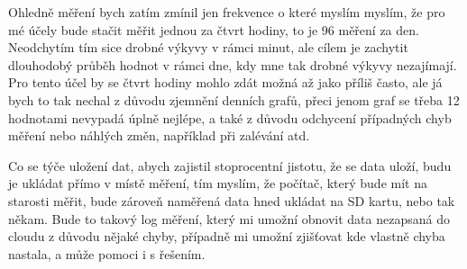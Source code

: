 
Ohledně měření bych zatím zmínil jen frekvence o které myslím myslím, že pro mé účely bude stačit měřit jednou za čtvrt 
hodiny, to je 96 měření za den. Neodchytím tím sice drobné výkyvy v rámci minut, ale cílem je zachytit dlouhodobý průběh 
hodnot v rámci dne, kdy mne tak drobné výkyvy nezajímají. Pro tento účel by se čtvrt hodiny mohlo zdát možná až jako 
příliš často, ale já bych to tak nechal z důvodu zjemnění denních grafů, přeci jenom graf se třeba 12 hodnotami nevypadá 
úplně nejlépe, a také z důvodu odchycení případných chyb měření nebo náhlých změn, například při zalévání atd.

Co se týče uložení dat, abych zajistil stoprocentní jistotu, že se data uloží, budu je ukládat přímo v místě měření, tím 
myslím, že počítač, který bude mít na starosti měřit, bude zároveň naměřená data hned ukládat na SD kartu, nebo tak 
někam. Bude to takový log měření, který mi umožní obnovit data nezapsaná do cloudu z důvodu nějaké chyby, případně mi 
umožní zjišťovat kde vlastně chyba nastala, a může pomoci i s řešením.%

